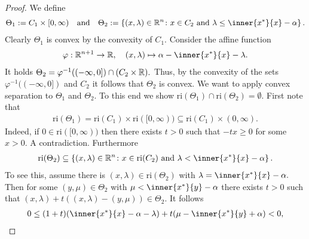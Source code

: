 \begin{proof}
  \emph{\cite[Theorem~4.23]{Mordukhovich2022}}
  We define
  \begin{gather}
    \Theta_1
    :=
    C_1 \times [0,\infty)
    \quad
    \text{and}
    \quad
    \Theta_2
    :=
    \left\{ 
      (x,\lambda)\in \R^n
      \colon
      x \in C_2
      \ 
      \text{and}
      \ 
      \lambda
      \le
      \inner{x^*}{x} - \alpha
    \right\}.
  \end{gather}
  Clearly $\Theta_1$ is convex by the convexity of $C_1.$
  Consider the affine function
  \begin{gather}
    \varphi:
    \R^{n+1} \to \R
    ,
    \quad
    (x,\lambda)
    \mapsto
    \alpha - \inner{x^*}{x} - \lambda.
  \end{gather}
  It holds 
  $
    \Theta_2
    =
    \varphi^{-1}((-\infty,0])
    \cap
    (
      C_2\times \mathbb{R}
    )
    .
  $
  Thus, by the convexity of the sets
  $
    \varphi^{-1}((-\infty,0])
  $
  and $C_2$
  it follows that $\Theta_2$ is convex.
  We want to apply convex separation to 
  $\Theta_1$ and $\Theta_2$.
  To this end we show 
  $\mathrm{ri}(\Theta_1)\cap\mathrm{ri}(\Theta_2)=\emptyset.$
  First note that
  \begin{gather}
    \mathrm{ri}(\Theta_1)
    =
    \mathrm{ri}(C_1)
    \times
    \mathrm{ri}([0,\infty))
    \subseteq
    \mathrm{ri}(C_1)
    \times
    (0,\infty).
  \end{gather}
  Indeed, if 
  $
    0\in
    \mathrm{ri}([0,\infty))
  $
  then there exists $t>0$ such that $-tx\ge 0$ for some $x>0.$ A contradiction.
  Furthermore
\begin{gather}
  \mathrm{ri}(\Theta_2)
  \subseteq
    \left\{ 
      (x,\lambda)\in \R^n
      \colon
      x \in \mathrm{ri}(C_2) 
      \ 
      \text{and}
      \ 
      \lambda
      <
      \inner{x^*}{x} - \alpha
    \right\}.
\end{gather}
To see this, assume there is 
$
(x,\lambda)
\in \mathrm{ri}(\Theta_2)
$
with
$
      \lambda
      =
      \inner{x^*}{x} - \alpha
      .
$
Then for some 
$
  (y,\mu)
  \in \Theta_2
$
with
$
      \mu    
      <
      \inner{x^*}{y} - \alpha
$
there exists $t>0$ such that 
$
  (x,\lambda)
  +
  t
  (
  (x,\lambda)
  -
  (y,\mu)
  )
  \in \Theta_2.
$
It follows
\begin{align}
  0
  \le
  (1+t)(\inner{x^*}{x}-\alpha -\lambda)
  +
  t
  (
    \mu 
    -\inner{x^*}{y}
    +
    \alpha
  )
  <0
,
\end{align}

\end{proof}
